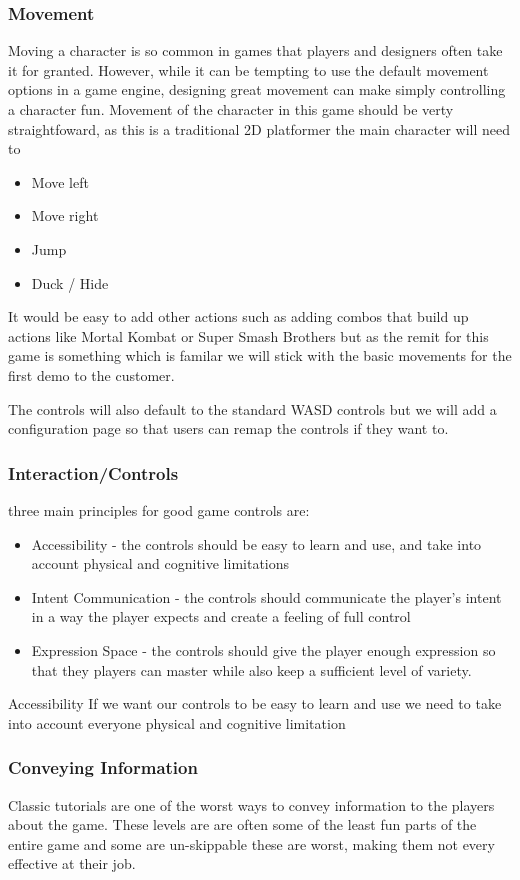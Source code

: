 \documentclass{article}
\begin{document}
\subsubsection{Movement}
Moving a character is so common in games that players and designers often take it for granted. However, while it can be tempting to use the default movement options in a game engine, designing great movement can make simply controlling a character fun. 
Movement of the character in this game should be verty straightfoward, as this is a traditional 2D platformer the main character will need to
\begin{itemize}
\item Move left
\item Move right
\item Jump
\item Duck / Hide
\end{itemize}

It would be easy to add other actions such as adding combos that build up actions like Mortal Kombat or Super Smash Brothers but as the remit for this game is something which is familar we will stick with the basic movements for the first demo to the customer.

The controls will also default to the standard WASD controls but we will add a configuration page so that users can remap the controls if they want to.

\subsubsection{Interaction/Controls}
three main principles for good game controls are:
\begin{itemize}
	\item Accessibility - the controls should be easy to learn and use, and take into account physical and cognitive limitations
	\item Intent Communication - the controls should communicate the player's intent in a way the player expects and create a feeling of full control
	\item Expression Space - the controls should give the player enough expression so that they players can master while also keep a sufficient level of variety.
\end{itemize}

Accessibility 
If we want our controls to be easy to learn and use we need to take into account everyone physical and cognitive limitation 

\subsubsection{Conveying Information}
Classic tutorials are one of the worst ways to convey information to the players about the game. These levels are are often some of the least fun parts of the entire game and some are un-skippable these are worst, making them not every effective at their job.
\end{document}
